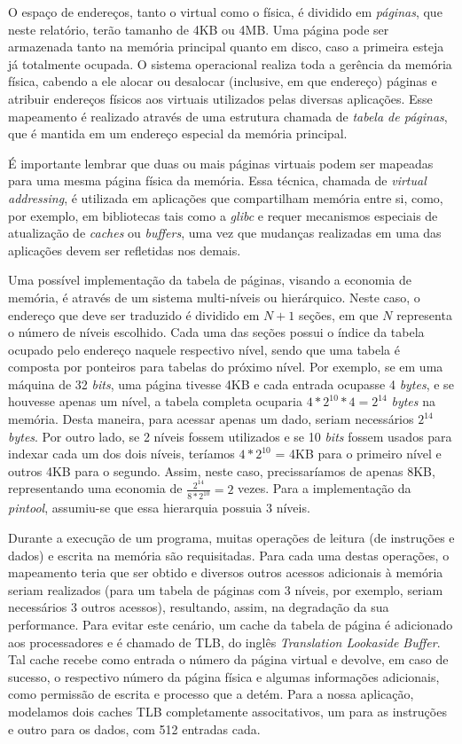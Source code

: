 \documentclass[12pt]{article}
\begin{document}
O espaço de endereços, tanto o virtual como o física, é dividido em
\textit{páginas}, que neste relatório, terão tamanho de 4KB ou 4MB. Uma página
pode ser armazenada tanto na memória principal quanto em disco, caso a primeira
esteja já totalmente ocupada. O sistema operacional realiza toda a gerência da
memória física, cabendo a ele alocar ou desalocar (inclusive, em que endereço)
páginas e atribuir endereços físicos aos virtuais utilizados pelas diversas
aplicações. Esse mapeamento é realizado através de uma estrutura chamada de
\textit{tabela de páginas}, que é mantida em um endereço especial da memória
principal.

É importante lembrar que duas ou mais páginas virtuais podem ser mapeadas para
uma mesma página física da memória. Essa técnica, chamada de \textit{virtual
addressing}, é utilizada em aplicações que compartilham memória entre si, como,
por exemplo, em bibliotecas tais como a \textit{glibc} e requer mecanismos
especiais de atualização de \textit{caches} ou \textit{buffers}, uma vez que
mudanças realizadas em uma das aplicações devem ser refletidas nos demais.

Uma possível implementação da tabela de páginas, visando a economia de memória,
é através de um sistema multi-níveis ou hierárquico. Neste caso, o endereço que 
deve ser traduzido é dividido em \(N+1\) seções, em que \(N\) representa o
número de níveis escolhido. Cada uma das seções possui o índice da tabela
ocupado pelo endereço naquele respectivo nível, sendo que uma tabela é composta
por ponteiros para tabelas do próximo nível. Por exemplo, se em uma máquina de
32 \textit{bits}, uma página tivesse 4KB e cada entrada ocupasse 4
\textit{bytes}, e se houvesse apenas um nível, a tabela completa ocuparia \(4 *
2 ^{10} * 4 = 2 ^ {14}\) \textit{bytes} na memória. Desta maneira, para acessar apenas um
dado, seriam necessários \(2 ^ {14}\) \textit{bytes}. Por outro lado, se
2 níveis fossem utilizados e se 10 \textit{bits} fossem usados para indexar cada
um dos dois níveis, teríamos \(4*2 ^{10}\) = 4KB para o primeiro nível e
outros 4KB para o segundo. Assim, neste caso, precissaríamos de apenas 8KB, representando
uma economia de \(\frac{2 ^ {14}}{8 * 2 ^{10}} = 2\) vezes. Para a implementação
da \textit{pintool}, assumiu-se que essa hierarquia possuia 3 níveis.

Durante a execução de um programa, muitas operações de leitura (de instruções
e dados) e escrita na memória são requisitadas. Para cada uma destas operações,
o mapeamento teria que ser obtido e diversos outros acessos
adicionais à memória seriam realizados (para um tabela de páginas com 3
níveis, por exemplo, seriam necessários 3 outros acessos), resultando, assim,
na degradação da sua performance. Para evitar este cenário, um cache da tabela
de página é adicionado aos processadores e é chamado de TLB, do inglês
\textit{Translation Lookaside Buffer}. Tal cache recebe como entrada o número da
página virtual e devolve, em caso de sucesso, o respectivo número da página
física e algumas informações adicionais, como permissão de escrita e processo
que a detém. Para a nossa aplicação, modelamos dois caches TLB completamente
associtativos, um para as instruções e outro para os dados, com 512 entradas
cada.
\end{document}
